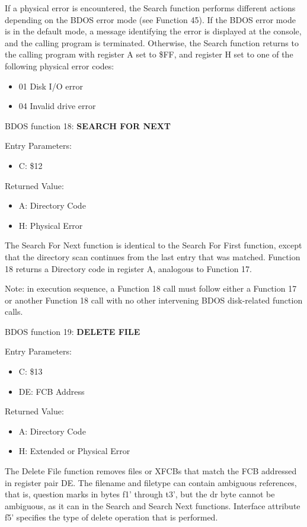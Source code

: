 If a physical error is encountered, the Search function performs
different actions depending on the BDOS error mode (see Function
45). If the BDOS error mode is in the default mode, a message
identifying the error is displayed at the console, and the calling
program is terminated. Otherwise, the Search function returns to the
calling program with register A set to \$FF, and register H set to
one of the following physical error codes:

\begin{itemize}
\item 01 Disk I/O error
\item 04 Invalid drive error
\end{itemize}

BDOS function 18: \textbf{SEARCH FOR NEXT}

Entry Parameters:
\begin{itemize}
\item[] C: \$12
\end{itemize}

Returned Value:
\begin{itemize}
\item[] A: Directory Code
\item[] H: Physical Error
\end{itemize}

The Search For Next function is identical to the Search For First
function, except that the directory scan continues from the last entry
that was matched. Function 18 returns a Directory code in register A,
analogous to Function 17.

Note: in execution sequence, a Function 18 call must follow either a
Function 17 or another Function 18 call with no other intervening BDOS
disk-related function calls.

BDOS function 19: \textbf{DELETE FILE}

Entry Parameters:
\begin{itemize}
\item[] C: \$13
\item[] DE: FCB Address
\end{itemize}

Returned Value:
\begin{itemize}
\item[] A: Directory Code
\item[] H: Extended or Physical Error
\end{itemize}

The Delete File function removes files or XFCBs that match the FCB
addressed in register pair DE. The filename and filetype can contain
ambiguous references, that is, question marks in bytes f1' through t3',
but the dr byte cannot be ambiguous, as it can in the Search and
Search Next functions. Interface attribute f5' specifies the type of
delete operation that is performed.


